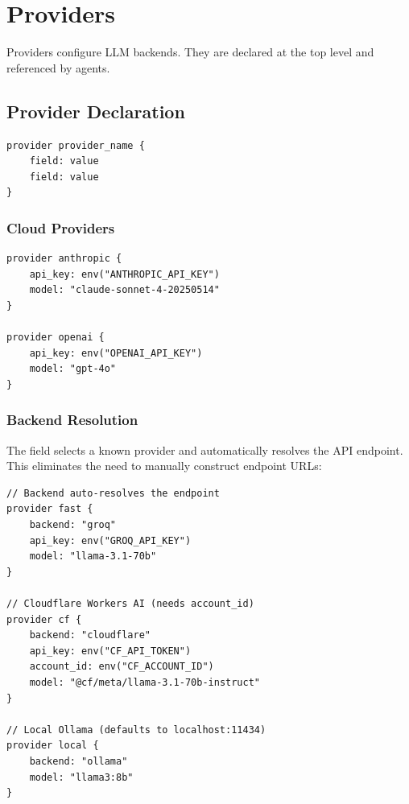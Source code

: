 \chapter{Providers}
\label{ch:providers}

Providers configure LLM backends. They are declared at the top level and referenced by agents.

\section{Provider Declaration}

\begin{lstlisting}
provider provider_name {
    field: value
    field: value
}
\end{lstlisting}

\subsection{Cloud Providers}

\begin{lstlisting}
provider anthropic {
    api_key: env("ANTHROPIC_API_KEY")
    model: "claude-sonnet-4-20250514"
}

provider openai {
    api_key: env("OPENAI_API_KEY")
    model: "gpt-4o"
}
\end{lstlisting}

\subsection{Backend Resolution}

The  field selects a known provider and automatically resolves the API endpoint. This eliminates the need to manually construct endpoint URLs:

\begin{lstlisting}
// Backend auto-resolves the endpoint
provider fast {
    backend: "groq"
    api_key: env("GROQ_API_KEY")
    model: "llama-3.1-70b"
}

// Cloudflare Workers AI (needs account_id)
provider cf {
    backend: "cloudflare"
    api_key: env("CF_API_TOKEN")
    account_id: env("CF_ACCOUNT_ID")
    model: "@cf/meta/llama-3.1-70b-instruct"
}

// Local Ollama (defaults to localhost:11434)
provider local {
    backend: "ollama"
    model: "llama3:8b"
}
\end{lstlisting}

